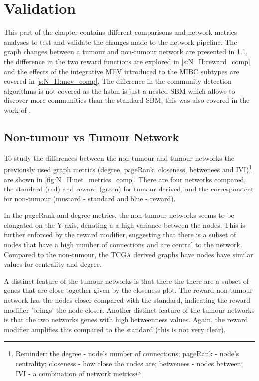\section{Validation} \label{s:N_II:validation}


This part of the chapter contains different comparisons and network metrics analyses to test and validate the changes made to the network pipeline. The graph changes between a tumour and non-tumour network are presented in \cref{s:N_II:net_comp}, the difference in the two reward functions are explored in \cref{s:N_II:reward_comp} and the effects of the integrative MEV introduced to the MIBC subtypes are covered in \cref{s:N_II:mev_comp}. The difference in the community detection algorithms is not covered as the \acrfull{hsbm} is just a nested SBM which allows to discover more communities than the standard SBM; this was also covered in the work of \citet{Peixoto2014-yb}.


\subsection{Non-tumour vs Tumour Network} \label{s:N_II:net_comp}

To study the differences between the non-tumour and tumour networks the previously used graph metrics (degree, pageRank, closeness, betwenees and IVI)\footnote{Reminder: the degree - node's number of connections; pageRank - node's centrality; closeness - how close the nodes are; betwenees - nodes between; IVI - a combination of network metrics} are shown in \cref{fig:N_II:net_metrics_comp}. There are four networks compared, the standard (red) and reward (green) for tumour derived, and the correspondent for non-tumour (mustard - standard and blue - reward).

In the pageRank and degree metrics, the non-tumour networks seems to be elongated on the Y-axis, denoting a a high variance between the nodes. This is further enforced by the reward modifier, suggesting that there is a subset of nodes that have a high number of connections and are central to the network. Compared to the non-tumour, the TCGA derived graphs have nodes have similar values for centrality and degree. 

A distinct feature of the tumour networks is that there the there are a subset of genes that are close together given by the closeness plot. The reward non-tumour network has the nodes closer compared with the standard, indicating the reward modifier 'brings' the node closer. Another distinct feature of the tumour networks is that the two networks genes with high betweenness values. Again, the reward modifier amplifies this compared to the standard (this is not very clear).

